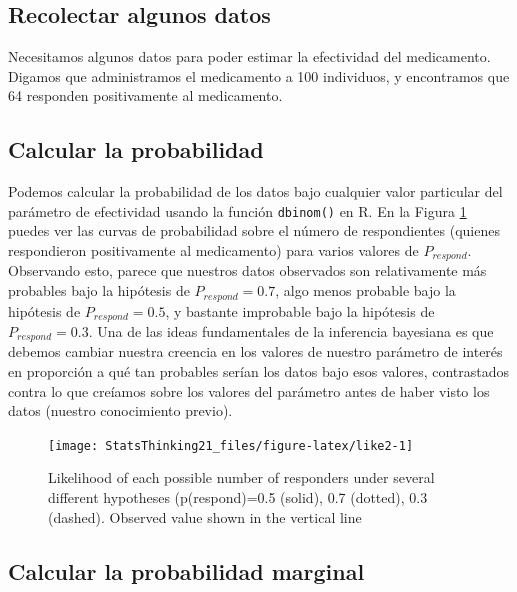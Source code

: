 \documentclass[
  12pt,
]{book}
\begin{document}
\hypertarget{recolectar-algunos-datos}{%
\subsection{Recolectar algunos datos}\label{recolectar-algunos-datos}}

Necesitamos algunos datos para poder estimar la efectividad del medicamento. Digamos que administramos el medicamento a 100 individuos, y encontramos que 64 responden positivamente al medicamento.

\hypertarget{calcular-la-probabilidad-1}{%
\subsection{Calcular la probabilidad}\label{calcular-la-probabilidad-1}}

Podemos calcular la probabilidad de los datos bajo cualquier valor particular del parámetro de efectividad usando la función \texttt{dbinom()} en R. En la Figura \ref{fig:like2} puedes ver las curvas de probabilidad sobre el número de respondientes (quienes respondieron positivamente al medicamento) para varios valores de \(P_ {respond}\). Observando esto, parece que nuestros datos observados son relativamente más probables bajo la hipótesis de \(P_ {respond} = 0.7\), algo menos probable bajo la hipótesis de \(P_ {respond} = 0.5\), y bastante improbable bajo la hipótesis de \(P_ {respond} = 0.3\). Una de las ideas fundamentales de la inferencia bayesiana es que debemos cambiar nuestra creencia en los valores de nuestro parámetro de interés en proporción a qué tan probables serían los datos bajo esos valores, contrastados contra lo que creíamos sobre los valores del parámetro antes de haber visto los datos (nuestro conocimiento previo).

\begin{figure}
\texttt{[image: StatsThinking21\_files/figure-latex/like2-1]} \caption{Likelihood of each possible number of responders under several different hypotheses (p(respond)=0.5 (solid), 0.7 (dotted), 0.3 (dashed).  Observed value shown in the vertical line}\label{fig:like2}
\end{figure}

\hypertarget{calcular-la-probabilidad-marginal-1}{%
\subsection{Calcular la probabilidad marginal}\label{calcular-la-probabilidad-marginal-1}}
\end{document}
